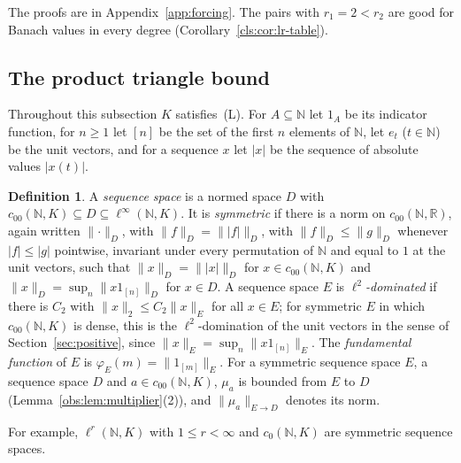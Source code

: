 \documentclass[11pt]{amsart}
\theoremstyle{definition}
\newtheorem{definition}[theorem]{Definition}
\theoremstyle{remark}
\numberwithin{equation}{section}
\newcommand{\N}{\mathbb N}
\newcommand{\linf}{\ell^\infty}
\newcommand{\abs}[1]{\lvert #1\rvert}
\newcommand{\norm}[1]{\lVert #1\rVert}
\theoremstyle{plain}
\theoremstyle{definition}
\theoremstyle{plain}
\begin{document}
The proofs are in Appendix~\ref{app:forcing}. The pairs with $r_1=2<r_2$ are good for Banach values in every degree
(Corollary~\ref{cls:cor:lr-table}).

\subsection{The product triangle bound}\label{obs:ssec:ptb}
Throughout this subsection $K$ satisfies~\textup{(L)}. For $A\subseteq\N$ let $1_A$ be its indicator function, for
$n\ge1$ let $[n]$ be the set of the first $n$ elements of $\N$, let $e_t$ ($t\in\N$) be the unit vectors, and for a
sequence $x$ let $\abs x$ be the sequence of absolute values $\abs{x(t)}$.

\begin{definition}\label{obs:def:sequence-spaces}
A \emph{sequence space} is a normed space $D$ with $c_{00}(\N,K)\subseteq D\subseteq\linf(\N,K)$. It is
\emph{symmetric} if there is a norm on $c_{00}(\N,\mathbb R)$, again written $\norm\cdot_D$, with
$\norm f_D=\norm{\abs f}_D$, with $\norm f_D\le\norm g_D$ whenever $\abs f\le\abs g$ pointwise, invariant under every
permutation of $\N$ and equal to $1$ at the unit vectors, such that $\norm x_D=\norm{\abs x}_D$ for $x\in c_{00}(\N,K)$ and
$\norm x_D=\sup_n\norm{x1_{[n]}}_D$ for $x\in D$. A sequence space $E$ is \emph{$\ell^2$\nobreakdash-dominated} if there is
$C_2$ with $\norm x_2\le C_2\norm x_E$ for all $x\in E$; for symmetric $E$ in which $c_{00}(\N,K)$ is dense, this is the
$\ell^2$\nobreakdash-domination of the unit vectors in the sense of Section~\ref{sec:positive}, since $\norm x_E=\sup_n\norm{x1_{[n]}}_E$. The
\emph{fundamental function} of $E$ is $\varphi_E(m)=\norm{1_{[m]}}_E$. For a symmetric sequence space $E$, a sequence
space $D$ and $a\in c_{00}(\N,K)$, $\mu_a$ is bounded from $E$ to $D$ (Lemma~\ref{obs:lem:multiplier}(2)), and
$\norm{\mu_a}_{E\to D}$ denotes its norm.
\end{definition}

For example, $\ell^r(\N,K)$ with $1\le r<\infty$ and $c_0(\N,K)$ are symmetric sequence spaces.
\end{document}
